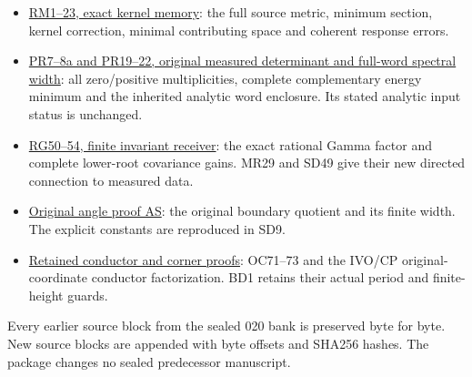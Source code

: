 \documentclass[11pt]{article}
\begin{document}
\begin{itemize}
\tightlist
\item
  \href{https://github.com/KokunoYumeto/zeta-function-research-reader/blob/13ca9b136fcdae48df7454bd9bf99e1ef22dd03c/workbenches/splitzero-tandem/continuations/20260922-original-growth-resolvent/ORIGINAL_RESOLVENT_MEMORY_PROOFS.md}{RM1--23, exact kernel memory}: the full source metric, minimum section, kernel correction, minimal contributing space and coherent response errors.
\item
  \href{https://github.com/KokunoYumeto/zeta-function-research-reader/blob/13ca9b136fcdae48df7454bd9bf99e1ef22dd03c/workbenches/splitzero-tandem/continuations/20260922-original-growth-resolvent/RECEIVED_RESOLVENT_PROOFS.md}{PR7--8a and PR19--22, original measured determinant and full-word spectral width}: all zero/positive multiplicities, complete complementary energy minimum and the inherited analytic word enclosure. Its stated analytic input status is unchanged.
\item
  \href{https://github.com/KokunoYumeto/zeta-function-research-reader/blob/13ca9b136fcdae48df7454bd9bf99e1ef22dd03c/workbenches/splitzero-tandem/continuations/20260922-original-growth-resolvent/GROWTH_PROOFS.md}{RG50--54, finite invariant receiver}: the exact rational Gamma factor and complete lower-root covariance gains. MR29 and SD49 give their new directed connection to measured data.
\item
  \href{https://github.com/KokunoYumeto/zeta-function-research-reader/blob/9b7b0bad40b33dc88bba7d8cb1548da1fadbb585/workbenches/splitzero-tandem/continuations/20260921-original-angle-word/ANGLE_PROOFS.md}{Original angle proof AS}: the original boundary quotient and its finite width. The explicit constants are reproduced in SD9.
\item
  \href{https://github.com/KokunoYumeto/zeta-function-research-reader/blob/13ca9b136fcdae48df7454bd9bf99e1ef22dd03c/workbenches/splitzero-tandem/continuations/20260922-original-growth-resolvent/RETAINED_COMPLETE_PROOF_SOURCES.tex\#L128308}{Retained conductor and corner proofs}: OC71--73 and the IVO/CP original-coordinate conductor factorization. BD1 retains their actual period and finite-height guards.
\end{itemize}

Every earlier source block from the sealed 020 bank is preserved byte for byte. New source blocks are appended with byte offsets and SHA256 hashes. The package changes no sealed predecessor manuscript.
\end{document}

